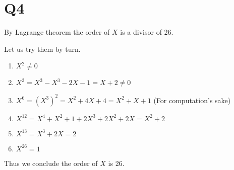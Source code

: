 \documentclass[12pt, a4paper]{article}
\theoremstyle{definition}
\theoremstyle{remark}
\begin{document}
\section{Q4}

By Lagrange theorem the order of $X$ is a divisor of 26.

Let us try them by turn.

\begin{enumerate}
	\item $X^2 \neq 0$
	\item $X^3 = X^3 - X^3 -2X - 1 = X + 2 \neq 0$
	\item $X^6 = (X^3)^2 = X^2+4X+4 = X^2+X+1 $ (For computation's sake)
	\item $X^{12} = X^4 + X^2 + 1 + 2X^3+2X^2+2X = X^2+2$
	\item $X^{13} = X^3 + 2X = 2$
	\item $X^{26} = 1$
\end{enumerate}

Thus we conclude the order of $X$ is 26.
\end{document}
